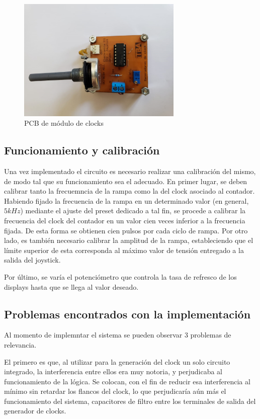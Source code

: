 \begin{figure}[H]
    \centering
    \includegraphics[width=0.7\textwidth]{../EJ8/Recursos/clocksPCB}
    \caption{\label{fig:BLOCK_DIAG}PCB de m\'odulo de clocks}
\end{figure}


\subsection{Funcionamiento y calibraci\'on}


Una vez implementado el circuito es necesario realizar una calibraci\'on del mismo, de modo tal que su funcionamiento sea el adecuado. En primer lugar, se deben calibrar tanto la frecuemncia de la rampa como la del clock asociado al contador. Habiendo fijado la frecuencia de la rampa en un determinado valor (en general, $5kHz$) mediante el ajuste del preset dedicado a tal fin, se procede a calibrar la frecuencia del clock del contador en un valor cien veces inferior a la frecuencia fijada. De esta forma se obtienen cien pulsos por cada ciclo de rampa. Por otro lado, es tambi\'en necesario calibrar la amplitud de la rampa, estableciendo que el l\'imite superior de esta corresponda al m\'aximo valor de tensi\'on entregado a la salida del joystick.

Por \'ultimo, se var\'ia el potenci\'ometro que controla la tasa de refresco de los displays hasta que se llega al valor deseado.

\subsection{Problemas encontrados con la implementaci\'on}
Al momento de implemntar el sistema se pueden observar 3 problemas de relevancia.

El primero es que, al utilizar para la generaci\'on del clock un solo circuito integrado, la interferencia entre ellos era muy notoria, y perjudicaba al funcionamiento de la l\'ogica. Se colocan, con el fin de reducir esa interferencia al m\'inimo sin retardar los flancos del clock, lo que perjudicar\'ia a\'un m\'as el funcionamiento del sistema, capacitores de filtro entre los terminales de salida del generador de clocks.

